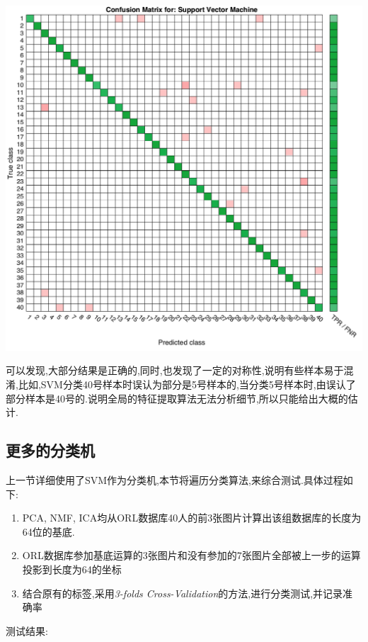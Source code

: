 	\begin{center}
	\begin{minipage}[t]{\linewidth}
	\center
	{
	\includegraphics[width=\textwidth]{Img/svm_confuse} 
	}
	\end{minipage}
	\medskip
	\end{center}
	可以发现,大部分结果是正确的,同时,也发现了一定的对称性,说明有些样本易于混淆,比如,SVM分类40号样本时误认为部分是5号样本的,当分类5号样本时,由误认了部分样本是40号的.说明全局的特征提取算法无法分析细节,所以只能给出大概的估计.

\subsection{更多的分类机}

上一节详细使用了SVM作为分类机,本节将遍历分类算法,来综合测试.具体过程如下:
	\begin{enumerate}
		\item PCA, NMF, ICA均从ORL数据库40人的前3张图片计算出该组数据库的长度为64位的基底.
		\item ORL数据库参加基底运算的3张图片和没有参加的7张图片全部被上一步的运算投影到长度为64的坐标
		\item 结合原有的标签,采用\textit{3-folds Cross-Validation}的方法,进行分类测试,并记录准确率
	\end{enumerate}
	测试结果:

